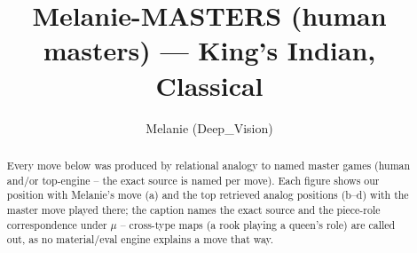 \documentclass[11pt]{article}
\title{Melanie-MASTERS (human masters) — King's Indian, Classical}
\author{Melanie (Deep\_Vision)}
\date{}
\begin{document}
\maketitle

\begin{abstract}Every move below was produced by relational analogy to named master games (human and/or top-engine -- the exact source is named per move). Each figure shows our position with Melanie's move (a) and the top retrieved analog positions (b--d) with the master move played there; the caption names the exact source and the piece-role correspondence under $\mu$ -- cross-type maps (a rook playing a queen's role) are called out, as no material/eval engine explains a move that way.\end{abstract}

\begin{figure}[p]\centering
\begin{subfigure}{0.46\textwidth}\centering
\resizebox{\linewidth}{!}{%
\newchessgame
\chessboard[
  setfen={rnbq1rk1/ppp2pbp/3p1np1/4p3/2PPP3/2N2N2/PP2BPPP/R1BQK2R w KQ - 0 7},
  showmover=false,
  pgfstyle=straightmove, color=movearrow, markmove={a1-b1}
]}
\caption{}
\end{subfigure}\hfill
\begin{subfigure}{0.46\textwidth}\centering
\resizebox{\linewidth}{!}{%
\newchessgame
\chessboard[
  setfen={r1bq1rk1/2p2pbp/p1np1np1/1p6/3PP3/2NB1N1P/PP3PP1/R1BQR1K1 w - - 0 11},
  showmover=false,
  pgfstyle=straightmove, color=movearrow, markmove={c1-g5}
]}
\caption{}
\end{subfigure}
\\[4pt]
\begin{subfigure}{0.46\textwidth}\centering
\resizebox{\linewidth}{!}{%
\newchessgame
\chessboard[
  setfen={rn1q1rk1/pp3pbp/3p1np1/2pP4/2P1b1P1/2N2N1P/PP2BP2/R1BQK2R w KQ - 1 11},
  showmover=false,
  pgfstyle=straightmove, color=movearrow, markmove={a2-a4}
]}
\caption{}
\end{subfigure}\hfill
\begin{subfigure}{0.46\textwidth}\centering
\resizebox{\linewidth}{!}{%
\newchessgame
\chessboard[
  setfen={r2qk2r/pp1bbppp/2n2n2/2p5/3p4/1P2PNP1/PB1P1PBP/RN1Q1RK1 b kq - 2 11},
  showmover=false,
  pgfstyle=straightmove, color=movearrow, markmove={d7-g4}
]}
\caption{}
\end{subfigure}

\end{figure}
\end{document}
